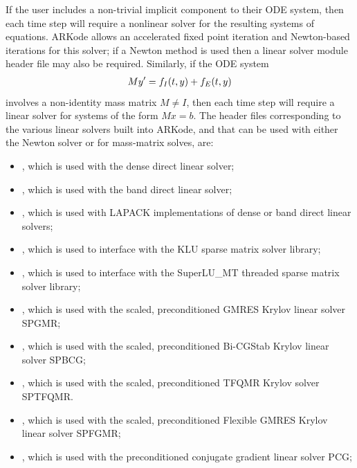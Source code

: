 \documentclass[letterpaper,10pt,english]{sphinxmanual}
\begin{document}
If the user includes a non-trivial implicit component to their
ODE system, then each time step will require a nonlinear solver for
the resulting systems of equations.  ARKode allows an accelerated
fixed point iteration and Newton-based iterations for this solver; if
a Newton method is used then a linear solver module header file may
also be required.  Similarly, if the ODE system
\begin{gather}
\begin{split}M y' = f_I(t,y) + f_E(t,y)\end{split}\notag
\end{gather}
involves a non-identity mass matrix \(M\ne I\), then each time
step will require a linear solver for systems of the form
\(Mx=b\).  The header files corresponding to the various linear
solvers built into ARKode, and that can be used with either the Newton
solver or for mass-matrix solves, are:
\begin{itemize}
\item {} 
, which is used with the dense direct linear solver;

\item {} 
, which is used with the band direct linear solver;

\item {} 
, which is used with LAPACK implementations of dense
or band direct linear solvers;

\item {} 
, which is used to interface with the KLU sparse
matrix solver library;

\item {} 
, which is used to interface with the
SuperLU\_MT threaded sparse matrix solver library;

\item {} 
, which is used with the scaled, preconditioned GMRES
Krylov linear solver SPGMR;

\item {} 
, which is used with the scaled, preconditioned
Bi-CGStab Krylov linear solver SPBCG;

\item {} 
, which is used with the scaled, preconditioned
TFQMR Krylov solver SPTFQMR.

\item {} 
, which is used with the scaled, preconditioned
Flexible GMRES Krylov linear solver SPFGMR;

\item {} 
, which is used with the preconditioned
conjugate gradient linear solver PCG;

\end{itemize}
\end{document}
